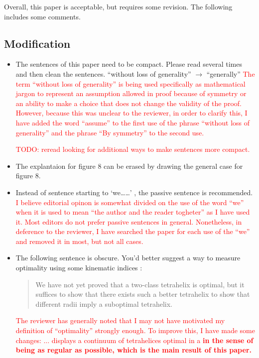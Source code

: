 \documentclass{article}
\newcommand{\highlighttext}[1] {\textcolor{red}{#1}}
\begin{document}
Overall, this paper is acceptable, but requires some revision. The following includes some comments.

\subsection{Modification}
\begin{itemize}
\item
The sentences of this paper need to be compact. Please read several times and then clean
the sentences.
``without loss of generality'' $\rightarrow$ ``generally''
\highlighttext{The term ``without loss of generality'' is being used specifically as mathematical jargon\cite{wiki:wolog} to represent an assumption allowed in proof because of symmetry or an ability to make
  a choice that does not change the validity of the proof.
  However, because this was unclear to the reviewer, in order to clarify this, I have added the word ``assume'' to the first use of the phrase ``without loss of generality'' and the phrase ``By symmetry'' to the second use.
  }

\highlighttext{TODO: reread looking for additional ways to make sentences more compact.}
\item
  The explantaion for figure 8 can be erased by drawing the general case for figure 8.
  \item
    Instead of sentence starting to ‘we……’ , the passive sentence is recommended.
    \highlighttext{
      I believe editorial opinon is somewhat divided on the use of the word ``we'' when it is used to mean ``the author and the reader togheter'' as I have used it. Most editors do not prefer passive sentences in general.
      Nonetheless, in deference to the reviewer, I have searched the paper for each use of the ``we'' and
      removed it in most, but not all cases.
      }
    \item 
 The following sentence is obscure. You’d better suggest a way to measure optimality using
 some kinematic indices :
\begin{quote}
 We have not yet proved that a two-class tetrahelix is optimal, but it suffices to show
that there exists such a better tetrahelix to show that different radii imply a suboptimal
tetrahelix.
\end{quote}

\highlighttext{
  The reviewer has generally noted that I may not have motivated my definition of ``optimality''
  strongly enough. To improve this, I have made some changes:
... displays a continuum of tetrahelices optimal in a \bf{
  in the sense of being
as regular as possible},
which is the main result of this
paper.
}


\end{itemize}
\end{document}
